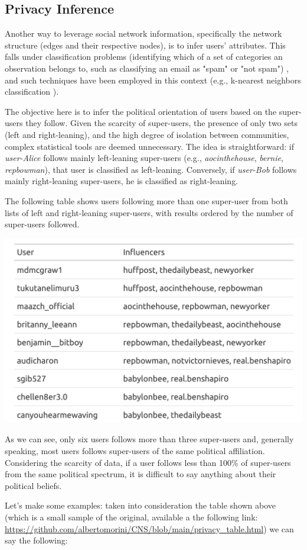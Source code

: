 \subsection{Privacy Inference}
Another way to leverage social network information, specifically the network structure (edges and their respective nodes), is to infer users' attributes. This falls under classification problems (identifying which of a set of categories an observation belongs to, such as classifying an email as "spam" or "not spam") \cite{wikiClassification}, and such techniques have been employed in this context (e.g., k-nearest neighbors classification \cite{wikiKNN}).

The objective here is to infer the political orientation of users based on the super-users they follow. Given the scarcity of super-users, the presence of only two sets (left and right-leaning), and the high degree of isolation between communities, complex statistical tools are deemed unnecessary. The idea is straightforward: if \textit{user-Alice} follows mainly left-leaning super-users (e.g., \textit{aocinthehouse}, \textit{bernie}, \textit{repbowman}), that user is classified as left-leaning. Conversely, if \textit{user-Bob} follows mainly right-leaning super-users, he is classified as right-leaning.

The following table shows users following more than one super-user from both lists of left and right-leaning super-users, with results ordered by the number of super-users followed.

\aCapo{}
\includegraphics[width = .5\textwidth]{images/final_privacy_table.png}

As we can see, only six users follows more than three super-users and, generally speaking, most users follows super-users of the same political affiliation. Considering the scarcity of data, if a user follows less than 100\% of super-users from the same political spectrum, it is difficult to say anything about their political beliefs.

Let's make some examples: taken into consideration the table shown above (which is a small sample of the original, available a the following link: \url{https://github.com/albertomorini/CNS/blob/main/privacy_table.html}) we can say the following:

